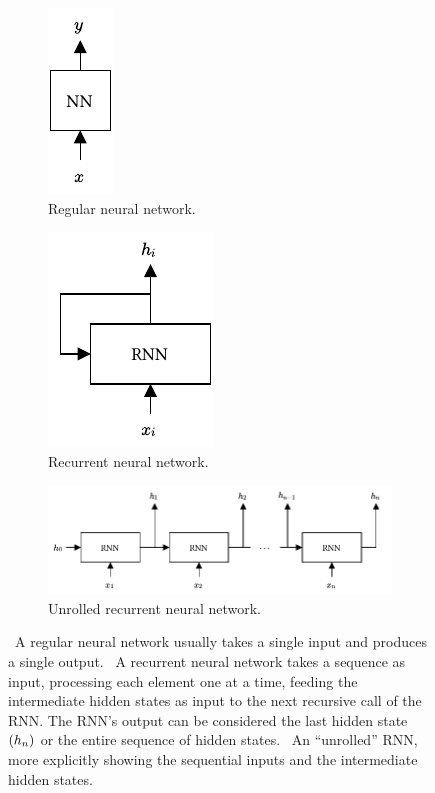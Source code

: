 \begin{figure}[ht]
    \centering
    \begin{subfigure}[t]{0.48\linewidth}
        \centering
        \includegraphics[scale = 1.35]{report/figures/nn.pdf}
        \caption{Regular neural network.}
        \label{subfig:nn}
    \end{subfigure}%
    \hfill
    \begin{subfigure}[t]{0.48\linewidth}
        \centering
        \includegraphics[scale = 1.35]{report/figures/rnn.pdf}
        \caption{Recurrent neural network.}
        \label{subfig:rnn}
    \end{subfigure}
    
    \begin{subfigure}[t]{1\linewidth}
        \centering
        \includegraphics[scale = 1.35]{report/figures/rnn_unrolled.pdf}
        \caption{Unrolled recurrent neural network.}
        \label{subfig:rnn_unrolled}
    \end{subfigure}
    \caption{~A regular neural network usually takes a single input and produces a single output. ~A recurrent neural network takes a sequence as input, processing each element one at a time, feeding the intermediate hidden states as input to the next recursive call of the RNN. The RNN's output can be considered the last hidden state ${\mathopen{} \left( h_n \right) \mathclose{}}$ or the entire sequence of hidden states. ~An ``unrolled'' RNN, more explicitly showing the sequential inputs and the intermediate hidden states.}
    \label{fig:rnn_comparison}
\end{figure}

